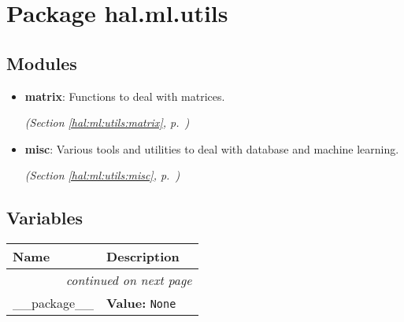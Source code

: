 %
%
%


\section{Package hal.ml.utils}

    \label{hal:ml:utils}


\subsection{Modules}

\begin{itemize}
\setlength{\parskip}{0ex}
\item \textbf{matrix}: Functions to deal with matrices. 


  \textit{(Section \ref{hal:ml:utils:matrix}, p.~\pageref{hal:ml:utils:matrix})}

\item \textbf{misc}: Various tools and utilities to deal with database and machine learning. 


  \textit{(Section \ref{hal:ml:utils:misc}, p.~\pageref{hal:ml:utils:misc})}

\end{itemize}



  \subsection{Variables}

    \vspace{-1cm}
\hspace{\varindent}\begin{longtable}{|p{\varnamewidth}|p{\vardescrwidth}|l}
\cline{1-2}
\cline{1-2} \centering \textbf{Name} & \centering \textbf{Description}& \\
\cline{1-2}
\endhead\cline{1-2}\multicolumn{3}{r}{\small\textit{continued on next page}}\\\endfoot\cline{1-2}
\endlastfoot\raggedright \_\-\_\-p\-a\-c\-k\-a\-g\-e\-\_\-\_\- & \raggedright \textbf{Value:} 
{\tt None}&\\
\cline{1-2}
\end{longtable}

